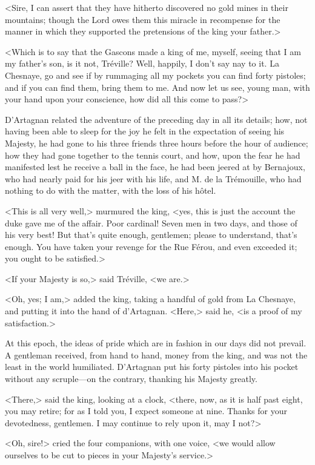 <Sire, I can assert that they have hitherto discovered no gold mines in their mountains; though the Lord owes them this miracle in recompense for the manner in which they supported the pretensions of the king your father.> 

<Which is to say that the Gascons made a king of me, myself, seeing that I am my father's son, is it not, Tréville? Well, happily, I don't say nay to it. La Chesnaye, go and see if by rummaging all my pockets you can find forty pistoles; and if you can find them, bring them to me. And now let us see, young man, with your hand upon your conscience, how did all this come to pass?> 

D'Artagnan related the adventure of the preceding day in all its details; how, not having been able to sleep for the joy he felt in the expectation of seeing his Majesty, he had gone to his three friends three hours before the hour of audience; how they had gone together to the tennis court, and how, upon the fear he had manifested lest he receive a ball in the face, he had been jeered at by Bernajoux, who had nearly paid for his jeer with his life, and M. de la Trémouille, who had nothing to do with the matter, with the loss of his hôtel. 

<This is all very well,> murmured the king, <yes, this is just the account the duke gave me of the affair. Poor cardinal! Seven men in two days, and those of his very best! But that's quite enough, gentlemen; please to understand, that's enough. You have taken your revenge for the Rue Férou, and even exceeded it; you ought to be satisfied.> 

<If your Majesty is so,> said Tréville, <we are.> 

<Oh, yes; I am,> added the king, taking a handful of gold from La Chesnaye, and putting it into the hand of d'Artagnan. <Here,> said he, <is a proof of my satisfaction.> 

At this epoch, the ideas of pride which are in fashion in our days did not prevail. A gentleman received, from hand to hand, money from the king, and was not the least in the world humiliated. D'Artagnan put his forty pistoles into his pocket without any scruple---on the contrary, thanking his Majesty greatly. 

<There,> said the king, looking at a clock, <there, now, as it is half past eight, you may retire; for as I told you, I expect someone at nine. Thanks for your devotedness, gentlemen. I may continue to rely upon it, may I not?> 

<Oh, sire!> cried the four companions, with one voice, <we would allow ourselves to be cut to pieces in your Majesty's service.> 

